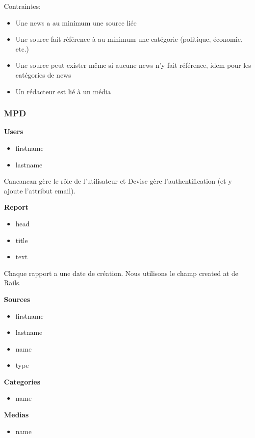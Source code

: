 \documentclass{article}
\begin{document}
Contraintes:
\begin{itemize}
\item Une news a au minimum une source liée
\item Une source fait référence à au minimum une catégorie (politique, économie, etc.)
\item Une source peut exister même si aucune news n'y fait référence, idem pour les catégories de news
\item Un rédacteur est lié à un média
\end{itemize}

\subsubsection{MPD}

\textbf{Users}

\begin{itemize}
\item firstname
\item lastname
\end{itemize}

Cancancan gère le rôle de l'utilisateur et Devise gère l'authentification (et y ajoute l'attribut email).

\textbf{Report}

\begin{itemize}
\item head
\item title
\item text
\end{itemize}

Chaque rapport a une date de création. Nous utilisons le champ created at de Rails.

\textbf{Sources}

\begin{itemize}
\item firstname
\item lastname
\item name
\item type
\end{itemize}

\textbf{Categories}

\begin{itemize}
\item name
\end{itemize}

\textbf{Medias}

\begin{itemize}
\item name
\end{itemize}
\end{document}
